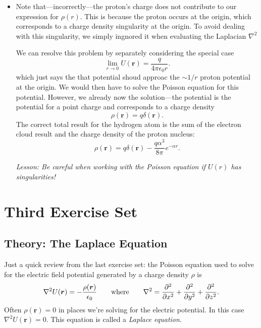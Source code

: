 \documentclass[11pt, a4paper]{article}
\newcommand{\eqtext}[1]{\qquad \text{#1} \qquad}
\renewcommand{\vec}[1]{\bm{#1}} %
\renewcommand{\r}{\vec{r}}
\newcommand{\ee}{\epsilon_{0}}  %
\renewcommand{\laplacian}{\nabla^{2}}
\begin{document}
\begin{itemize}
    \item Note that---incorrectly---the proton's charge does not contribute to our expression for $ \rho(r) $. This is because the proton occurs at the origin, which corresponds to a charge density singularity at the origin. To avoid dealing with this singularity, we simply ingnored it when evaluating the Laplacian $ \laplacian $

	
	We can resolve this problem by separately considering the special case
	\begin{equation*}
		\lim_{r\to 0}U(\r) = \frac{q}{4\pi \ee r}.
	\end{equation*}
	which just says the that potential shoud approac the $ \sim 1/r $ proton potential at the origin. We would then have to solve the Poisson equation for this potential. However, we already now the solution---the potential is the potential for a point charge and corresponds to a charge density
	\begin{equation*}
		\rho(\r) = q \delta(\r).
	\end{equation*}
	The correct total result for the hydrogen atom is the sum of the electron cloud result and the charge density of the proton nucleus:
	\begin{equation*}
		\rho(\r) = q \delta(\r) - \frac{q\alpha^{3}}{8 \pi}e^{-\alpha r}.
	\end{equation*}
	
	\textit{Lesson: Be careful when working with the Poisson equation if $ U(r) $ has singularities!}
	
\end{itemize}

\newpage
\section{Third Exercise Set}

\subsection{Theory: The Laplace Equation}
Just a quick review from the last exercise set: the Poisson equation used to solve for the electric field potential generated by a charge density $ \rho $ is
\begin{equation*}
	\nabla^{2}U(\r) = - \frac{\rho(\r)}{\ee} \eqtext{where} \laplacian = \pdv[2]{}{x} + \pdv[2]{}{y} + \pdv[2]{}{z}.
\end{equation*}
Often $ \rho(\r) = 0 $ in places we're solving for the electric potential. In this case $ \laplacian U(\r) = 0 $. This equation is called a \textit{Laplace equation}.
\end{document}
